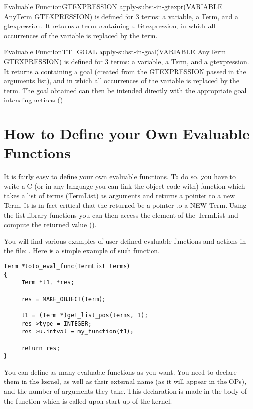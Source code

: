 \begin{typeefa}{Evaluable Function}{GTEXPRESSION} {apply-subst-in-gtexpr}{(VARIABLE
AnyTerm GTEXPRESSION)}
is defined for 3 terms: a variable, a Term, and a
gtexpression. It returns a term containing a Gtexpression,
in which all occurrences of the variable is replaced by the term. 
\end{typeefa}

\begin{typeefa}{Evaluable Function}{TT\_GOAL} {apply-subst-in-goal}{(VARIABLE AnyTerm GTEXPRESSION)}
is defined for 3 terms: a variable, a Term, and a gtexpression. It returns a
 containing a goal (created from the GTEXPRESSION passed in the
arguments list), and in which all occurrences of the variable is replaced by
the term.  The goal obtained can then be intended directly with the appropriate
goal intending actions ().
\end{typeefa}

\section{How to Define your Own Evaluable Functions}

It is fairly easy to define your own evaluable functions. To do so, you
have to write a C (or in any language you can link the object code with)
function which takes a list of terms (TermList) as arguments and returns a
pointer to a new Term. It is in fact critical that the  returned be
a pointer to a NEW Term. Using the list library functions you can then access
the element of the TermList and compute the returned value ().

You will find various examples of user-defined evaluable functions and
actions in the file: . Here is a simple example of
such function.

\begin{verbatim}
Term *toto_eval_func(TermList terms)
{
     Term *t1, *res;

     res = MAKE_OBJECT(Term);

     t1 = (Term *)get_list_pos(terms, 1);
     res->type = INTEGER;
     res->u.intval = my_function(t1);

     return res;
}
\end{verbatim}

You can define as many evaluable functions as you want.  You need to
declare them in the kernel, as well as their external name (as it will
appear in the OPs), and the number of arguments they take. This
declaration is made in the body of the 
function which is called upon start up of the kernel.

